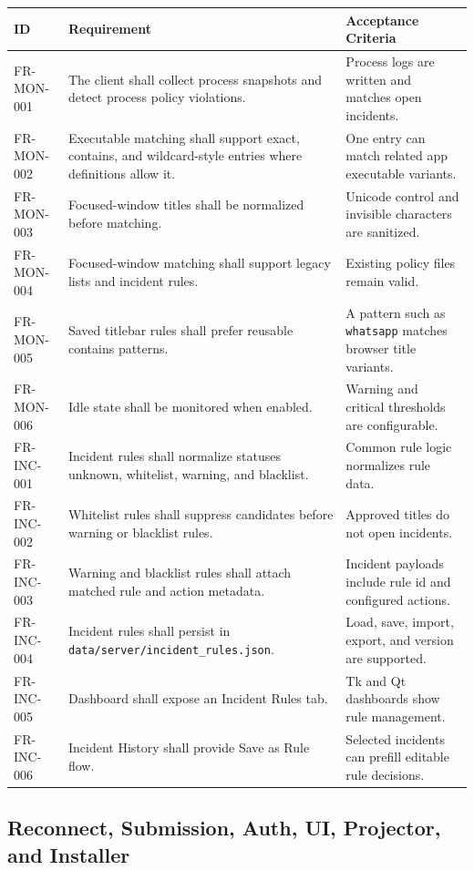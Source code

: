 \documentclass[12pt,a4paper]{article}
\begin{document}
\begin{longtable}{L{0.15\textwidth} L{0.47\textwidth} L{0.28\textwidth}}
\textbf{ID} & \textbf{Requirement} & \textbf{Acceptance Criteria} \\
\hline
FR-MON-001 & The client shall collect process snapshots and detect process policy violations. & Process logs are written and matches open incidents. \\
FR-MON-002 & Executable matching shall support exact, contains, and wildcard-style entries where definitions allow it. & One entry can match related app executable variants. \\
FR-MON-003 & Focused-window titles shall be normalized before matching. & Unicode control and invisible characters are sanitized. \\
FR-MON-004 & Focused-window matching shall support legacy lists and incident rules. & Existing policy files remain valid. \\
FR-MON-005 & Saved titlebar rules shall prefer reusable contains patterns. & A pattern such as \texttt{whatsapp} matches browser title variants. \\
FR-MON-006 & Idle state shall be monitored when enabled. & Warning and critical thresholds are configurable. \\
FR-INC-001 & Incident rules shall normalize statuses unknown, whitelist, warning, and blacklist. & Common rule logic normalizes rule data. \\
FR-INC-002 & Whitelist rules shall suppress candidates before warning or blacklist rules. & Approved titles do not open incidents. \\
FR-INC-003 & Warning and blacklist rules shall attach matched rule and action metadata. & Incident payloads include rule id and configured actions. \\
FR-INC-004 & Incident rules shall persist in \texttt{data/server/incident\_rules.json}. & Load, save, import, export, and version are supported. \\
FR-INC-005 & Dashboard shall expose an Incident Rules tab. & Tk and Qt dashboards show rule management. \\
FR-INC-006 & Incident History shall provide Save as Rule flow. & Selected incidents can prefill editable rule decisions. \\
\end{longtable}

\subsection{Reconnect, Submission, Auth, UI, Projector, and Installer}
\end{document}
